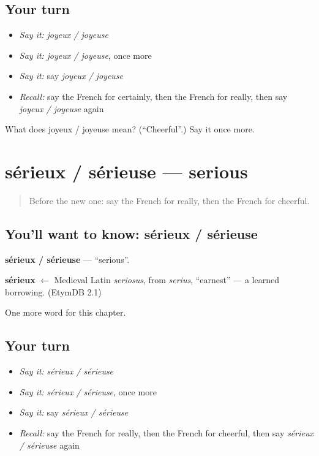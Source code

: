 \subsection*{Your turn}
\begin{itemize}
\raggedright
  \item \emph{Say it:} \emph{joyeux / joyeuse}
  \item \emph{Say it:} \emph{joyeux / joyeuse}, once more
  \item \emph{Say it:} say \emph{joyeux / joyeuse}
  \item \emph{Recall:} say the French for certainly, then the French for really, then say \emph{joyeux / joyeuse} again
\end{itemize}

\begin{tcolorbox}[breakable,colback=teal!4,colframe=teal!35!black,title={Before you move on}]
What does joyeux / joyeuse mean? (\textquotedblleft{}Cheerful\textquotedblright{}.) Say it once more.
\end{tcolorbox}
\section[sérieux / sérieuse]{sérieux / sérieuse — serious}

\label{lesson:FR-C190-serieux-serieuse}



\begin{quote}
Before the new one: say the French for really, then the French for cheerful.
\end{quote}

\subsection*{You'll want to know: sérieux / sérieuse}
\textbf{sérieux / sérieuse} — \textquotedblleft{}serious\textquotedblright{}.

\begin{cousinweb}
\textbf{sérieux} $\leftarrow$ Medieval Latin \emph{seriosus}, from \emph{serius}, \textquotedblleft{}earnest\textquotedblright{} — a learned borrowing. (EtymDB 2.1)
\end{cousinweb}

\begin{grammarlens}[title={What you've built}]
One more word for this chapter.
\end{grammarlens}

\subsection*{Your turn}
\begin{itemize}
\raggedright
  \item \emph{Say it:} \emph{sérieux / sérieuse}
  \item \emph{Say it:} \emph{sérieux / sérieuse}, once more
  \item \emph{Say it:} say \emph{sérieux / sérieuse}
  \item \emph{Recall:} say the French for really, then the French for cheerful, then say \emph{sérieux / sérieuse} again
\end{itemize}


